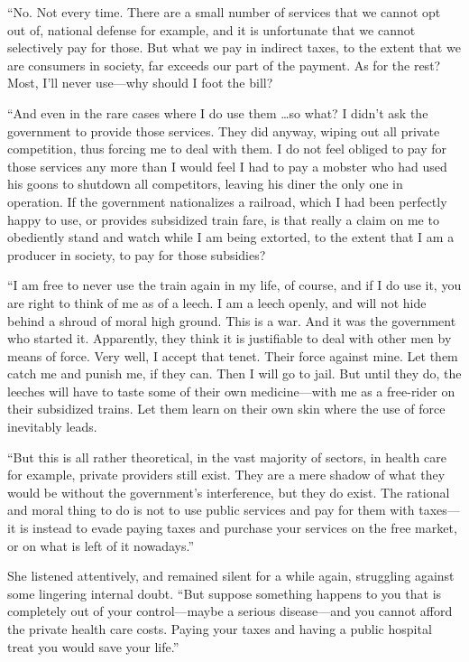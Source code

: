``No. Not every time. There are a small number of services that we cannot opt out of, national defense for example, and it is unfortunate that we cannot selectively pay for those. But what we pay in indirect taxes, to the extent that we are consumers in society, far exceeds our part of the payment. As for the rest? Most, I'll never use---why should I foot the bill?

``And even in the rare cases where I do use them \ldots so what? I didn't ask the government to provide those services. They did anyway, wiping out all private competition, thus forcing me to deal with them. I do not feel obliged to pay for those services any more than I would feel I had to pay a mobster who had used his goons to shutdown all competitors, leaving his diner the only one in operation. If the government nationalizes a railroad, which I had been perfectly happy to use, or provides subsidized train fare, is that really a claim on me to obediently stand and watch while I am being extorted, to the extent that I am a producer in society, to pay for those subsidies?

``I am free to never use the train again in my life, of course, and if I do use it, you are right to think of me as of a leech. I am a leech openly, and will not hide behind a shroud of moral high ground. This is a war. And it was the government who started it. Apparently, they think it is justifiable to deal with other men by means of force. Very well, I accept that tenet. Their force against mine. Let them catch me and punish me, if they can. Then I will go to jail. But until they do, the leeches will have to taste some of their own medicine---with me as a free-rider on their subsidized trains. Let them learn on their own skin where the use of force inevitably leads.

``But this is all rather theoretical, in the vast majority of sectors, in health care for example, private providers still exist. They are a mere shadow of what they would be without the government's interference, but they do exist. The rational and moral thing to do is not to use public services and pay for them with taxes---it is instead to evade paying taxes and purchase your services on the free market, or on what is left of it nowadays.''

She listened attentively, and remained silent for a while again, struggling against some lingering internal doubt. ``But suppose something happens to you that is completely out of your control---maybe a serious disease---and you cannot afford the private health care costs. Paying your taxes and having a public hospital treat you would save your life.''

